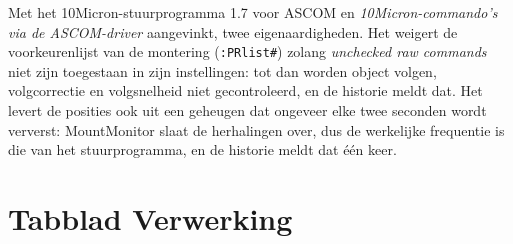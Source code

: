 Met het 10Micron-stuurprogramma 1.7 voor ASCOM en \emph{10Micron-commando's via
de ASCOM-driver} aangevinkt, twee eigenaardigheden. Het
weigert de voorkeurenlijst van de montering (\texttt{:PRlist\#}) zolang
\emph{unchecked raw commands} niet zijn toegestaan in zijn instellingen: tot dan
worden object volgen, volgcorrectie en volgsnelheid niet gecontroleerd, en de
historie meldt dat. Het levert de posities ook uit een geheugen dat ongeveer
elke twee seconden wordt ververst: MountMonitor slaat de herhalingen over, dus de
werkelijke frequentie is die van het stuurprogramma, en de historie meldt dat
één keer.

\needspace{0.6\textheight}
\section{Tabblad Verwerking}


